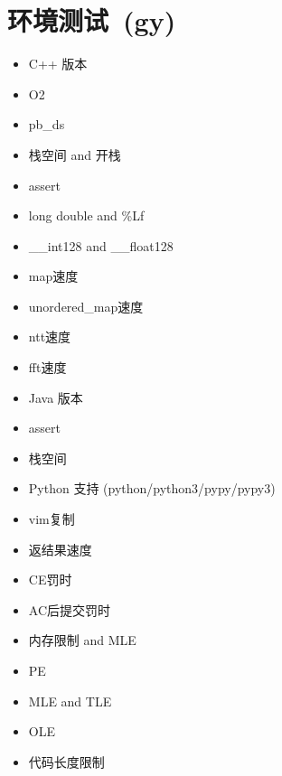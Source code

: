 \section{环境测试~\small(gy)}
    \begin{itemize}
        \item C++ 版本
        \item O2
        \item pb\_ds
        \item 栈空间 and 开栈
        \item assert
        \item long double and \%Lf
        \item \_\_int128 and \_\_float128
        \item map速度
        \item unordered\_map速度
        \item ntt速度
        \item fft速度
        \item Java 版本
        \item assert
        \item 栈空间
        \item Python 支持 (python/python3/pypy/pypy3)
        \item vim复制
        \item 返结果速度
        \item CE罚时
        \item AC后提交罚时
        \item 内存限制 and MLE
        \item PE
        \item MLE and TLE
        \item OLE
        \item 代码长度限制
    \end{itemize}
